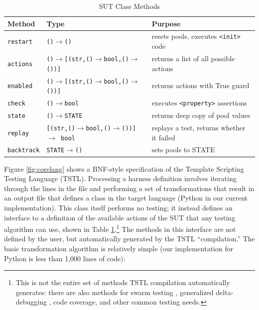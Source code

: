 \documentclass[runningheads,a4paper]{llncs}
\begin{document}
\begin{table}[t]
\begin{tabular}{|l|l|l|}
\hline
Method & Type & Purpose \\
\hline
\hline
{\tt restart} & {\tt ()$\rightarrow$()} & resets pools, executes {\tt <init>} code\\
{\tt actions} & {\tt ()$\rightarrow$[(str,()$\rightarrow$bool,()$\rightarrow$())]} & returns a list of all possible actions \\
{\tt enabled} & {\tt ()$\rightarrow$[(str,()$\rightarrow$bool,()$\rightarrow$())]} & returns actions with True guard\\
{\tt check} & {\tt ()$\rightarrow$bool} & executes {\tt <property>} assertions \\
{\tt state} & {\tt ()$\rightarrow$STATE} & returns deep copy of pool values\\
{\tt replay} & {\tt [(str,()$\rightarrow$bool,()$\rightarrow$())] $\rightarrow$ bool} & replays a test, returns whether it failed \\
{\tt backtrack} & {\tt STATE$\rightarrow$()} & sets pools to STATE \\
\hline
\end{tabular}
\caption{SUT Class Methods}
\label{tab:sutmethods}
\vspace{-0.3in}
\end{table}

Figure \ref{fig:corelang} shows a BNF-style specification of the
Template Scripting Testing Language (TSTL).  Processing a harness
definition involves iterating through the lines in the file and
performing a set of transformations that result in an output file that
defines a class in the target language (Python in our current
implementation).  This class itself performs no testing; it instead
defines an interface to a definition of the available actions of the
SUT that any testing algorithm can use, shown in Table
\ref{tab:sutmethods}.\footnote{This is not the entire set of methods
TSTL compilation automatically generates: there are also methods for
swarm testing \cite{ISSTA12}, generalized delta-debugging \cite{DD,icst2014}, code coverage, and
other common testing needs.}  The methods in this interface are not
defined by the user, but automatically generated by the TSTL
``compilation.''  The basic transformation algorithm is relatively
simple (our implementation for Python is less than 1,000 lines of
code):
\end{document}

